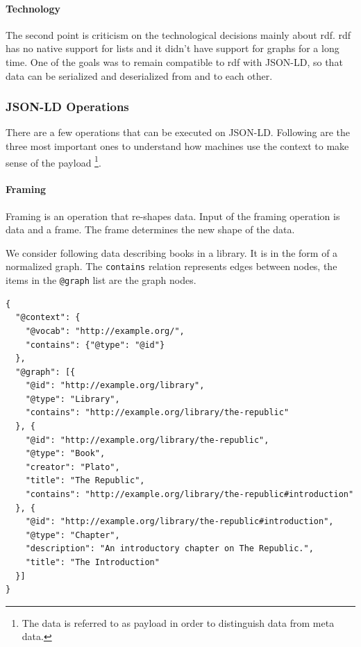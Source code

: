 \paragraph{Technology}
The second point is criticism on the technological decisions mainly about \gls{rdf}. \gls{rdf} has no native support for lists and it didn't have support for graphs for a long time. One of the goals was to remain compatible to \gls{rdf} with JSON-LD, so that data can be serialized and deserialized from and to each other. \citep{semanticwebrevisited}

\subsubsection{JSON-LD Operations}
There are a few operations that can be executed on JSON-LD. Following are the three most important ones to understand how machines use the context to make sense of the payload \footnote{The data is referred to as payload in order to distinguish data from meta data.}.

\paragraph{Framing}
Framing is an operation that re-shapes data. Input of the framing operation is data and a frame. The frame determines the new shape of the data.

We consider following data describing books in a library. It is in the form of a normalized graph. The \lstinline{contains} relation represents edges between nodes, the items in the \lstinline{@graph} list are the graph nodes.

\lstset{language=JSON}
\begin{lstlisting}[caption=Data of a library as normalized graph. \citep{jsonldbasicconcepts}]
{
  "@context": {
    "@vocab": "http://example.org/",
    "contains": {"@type": "@id"}
  },
  "@graph": [{
    "@id": "http://example.org/library",
    "@type": "Library",
    "contains": "http://example.org/library/the-republic"
  }, {
    "@id": "http://example.org/library/the-republic",
    "@type": "Book",
    "creator": "Plato",
    "title": "The Republic",
    "contains": "http://example.org/library/the-republic#introduction"
  }, {
    "@id": "http://example.org/library/the-republic#introduction",
    "@type": "Chapter",
    "description": "An introductory chapter on The Republic.",
    "title": "The Introduction"
  }]
}
\end{lstlisting}

